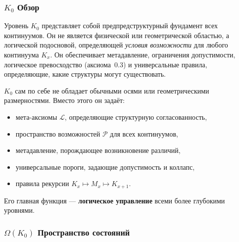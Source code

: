 

\subsubsection{\texorpdfstring{$K_0$}{K_0} Обзор}
\label{sec:k0-overview}

Уровень $K_0$ представляет собой предпредструктурный фундамент всех континуумов.
Он не является физической или геометрической областью, а логической
подосновой, определяющей
\emph{условия возможности} для любого континуума $K_x$.
Он обеспечивает метадавление, ограничения допустимости, логическое
превосходство (аксиома~0.3) и универсальные правила, определяющие,
какие структуры могут существовать.

$K_0$ сам по себе не обладает обычными осями или геометрическими
размерностями.
Вместо этого он задаёт:
\begin{itemize}
    \item мета-аксиомы $\mathcal{L}$, определяющие структурную согласованность,
    \item пространство возможностей $\mathcal{P}$ для всех континуумов,
    \item метадавление, порождающее возникновение различий,
    \item универсальные пороги, задающие допустимость и коллапс,
    \item правила рекурсии $K_x \mapsto M_x \mapsto K_{x+1}$.
\end{itemize}

Его главная функция —
\textbf{логическое управление} всеми более глубокими уровнями.

\subsubsection{\texorpdfstring{$\Omega(K_0)$}{\Omega(K_0)} Пространство состояний}

